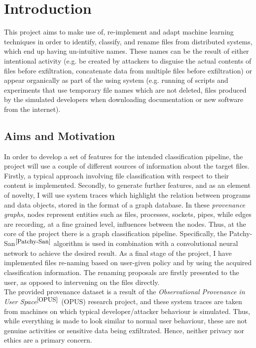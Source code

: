 

\chapter{Introduction}

This project aims to make use of, re-implement and adapt machine learning techniques in order to identify, classify, and rename files from distributed systems, which end up having un-intuitive names. These names can be the result of either intentional activity (e.g. be created by attackers to disguise the actual contents of files before exfiltration, concatenate data from multiple files before exfiltration) or appear organically as part of the using system (e.g. running of scripts and experiments that use temporary file names which are not deleted, files produced by the simulated developers when downloading documentation or new software from the internet). 


\section{Aims and Motivation}  \label{1.1}

In order to develop a set of features for the intended classification pipeline, the project will use a couple of different sources of information about the target files. Firstly, a typical approach involving file classification with respect to their content is implemented. Secondly, to generate further features, and as an element of novelty, I will use system traces which highlight the relation between programs and data objects, stored in the format of a graph database. In these \textit{provenance graphs}, nodes represent entities such as files, processes, sockets, pipes, while edges are recording, at a fine grained level, influences between the nodes. Thus, at the core of the project there is a graph classification pipeline. Specifically, the Patchy-San$^{\small \cite{Patchy-San}}$ algorithm is used in combination with a convolutional neural network to achieve the desired result. As a final stage of the project, I have implemented files re-naming based on user-given policy and by using the acquired classification information. The renaming proposals are firstly presented to the user, as opposed to intervening on the files directly. \\

The provided provenance dataset is a result of the \textit{Observational Provenance in User Space}$^{\small \cite{OPUS}}$ (OPUS) research project, and these system traces are taken from machines on which typical developer/attacker behaviour is simulated. Thus, while everything is made to look similar to normal user behaviour, these are not genuine activities or sensitive data being exfiltrated. Hence, neither privacy nor ethics are a primary concern. \\

